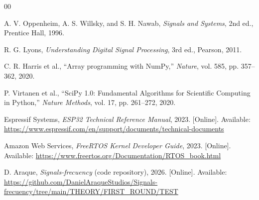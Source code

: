 
\begin{thebibliography}{00}

A. V. Oppenheim, A. S. Willsky, and S. H. Nawab,
\textit{Signals and Systems},
2nd ed., Prentice Hall, 1996.

R. G. Lyons,
\textit{Understanding Digital Signal Processing},
3rd ed., Pearson, 2011.

C. R. Harris et al.,
``Array programming with NumPy,''
\textit{Nature}, vol. 585, pp. 357--362, 2020.

P. Virtanen et al.,
``SciPy 1.0: Fundamental Algorithms for Scientific Computing in Python,''
\textit{Nature Methods}, vol. 17, pp. 261--272, 2020.

Espressif Systems,
\textit{ESP32 Technical Reference Manual},
2023. [Online]. Available: \url{https://www.espressif.com/en/support/documents/technical-documents}

Amazon Web Services,
\textit{FreeRTOS Kernel Developer Guide},
2023. [Online]. Available: \url{https://www.freertos.org/Documentation/RTOS_book.html}

D. Araque,
\textit{Signals-frecuency} (code repository),
2026. [Online]. Available: \url{https://github.com/DanielAraqueStudios/Signals-frecuency/tree/main/THEORY/FIRST_ROUND/TEST}

\end{thebibliography}
